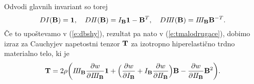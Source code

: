 Odvodi glavnih invariant so torej
\[
	DI(\mathbf B)=\mathbf 1,\quad DI\! I(\mathbf B)=I_{\mathbf B}\mathbf 1-\mathbf B^T,\quad
	DI\! I\! I(\mathbf B)=I\! I\! I_{\mathbf B}\mathbf B^{-T}.
\]
Če to upoštevamo v (\ref{e:dbshy}), rezultat pa nato v (\ref{e:tmalodrugace}), dobimo
izraz za Cauchyjev napetostni tenzor $\mathbf T$ za izotropno hiperelastično trdno materialno telo,
ki je
\begin{equation}
	\mathbf T=2\rho\bigg(
	I\! I\! I_{\mathbf B}\frac{\partial w}{\partial I\! I\! I_{\mathbf B}}\mathbf 1+
	\Big(\frac{\partial w}{\partial I_{\mathbf B}}+I_{\mathbf B}\frac{\partial w}{\partial I\! I_{\mathbf B}}\Big)\mathbf B-
	\frac{\partial w}{\partial I\! I_{\mathbf B}}\mathbf B^2
	\bigg).
\end{equation}